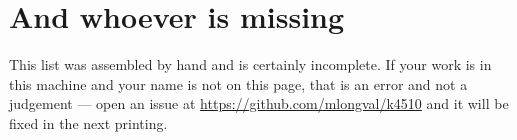 \section{And whoever is missing}
This list was assembled by hand and is certainly incomplete. If your
work is in this machine and your name is not on this page, that is an
error and not a judgement --- open an issue at
\url{https://github.com/mlongval/k4510} and it will be fixed in the
next printing.
\endgroup
